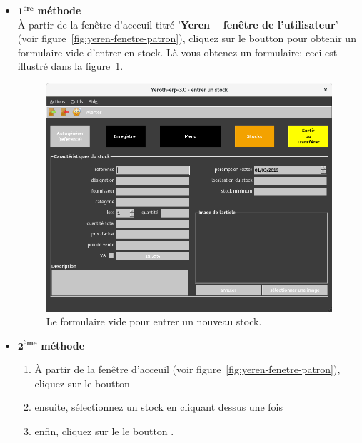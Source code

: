 \begin{itemize}[]
	\item \textcolor{purplish}{$\mathbf{1^{\text{\`ere}}}$ \textbf{m\'ethode}}\\
		   \`A partir de la fen\^etre d'acceuil titr\'e
		   '\textbf{Yeren -- fen\^etre de l'utilisateur}'
		   (voir figure~\ref{fig:yeren-fenetre-patron}), cliquez
		   sur le boutton  pour obtenir un
		   formulaire vide d'entrer en stock. L\`a vous obtenez
		   un formulaire; ceci est illustr\'e dans la
		   figure~\ref{fig:formulaire-entrer-1}.\\
		   
	      \begin{figure}[!htbp]
		  \centering
		  \includegraphics[scale=0.63]{images/yeren-fenetre-entrer.png}
		  \caption{Le formulaire vide pour entrer un nouveau stock.}
		  \label{fig:formulaire-entrer-1}
		  \end{figure}
	      
	      \newpage
	      
	\item \textcolor{purplish}{$\mathbf{2^{\text{\`eme}}}$ \textbf{m\'ethode}}
		\begin{enumerate}[1)]
			\item \`A partir de la fen\^etre d'acceuil
			(voir figure~\ref{fig:yeren-fenetre-patron}),
			cliquez sur le boutton 
			\item ensuite, s\'electionnez un stock en cliquant dessus une fois
			\item enfin, cliquez sur le le boutton .\\
		\end{enumerate}				
		

\end{itemize}
